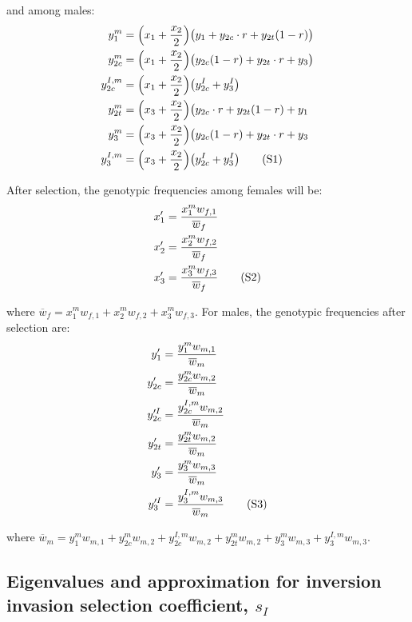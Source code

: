 \documentclass{article}
\newcommand\numberthis{\addtocounter{equation}{1}\tag{\theequation}}
\begin{document}
\begin{appendices}
\noindent and among males:
\begin{align*}
	y^m_{1}      &= \Big( x_1 + \frac{x_2}{2} \Big) \big(y_1 + y_{2c} \cdot r + y_{2t}(1 - r)  \big) \\
	y^m_{2c}     &= \Big( x_1 + \frac{x_2}{2} \Big) \big( y_{2c} (1 - r) + y_{2t} \cdot r + y_3 \big) \\
	y^{I,m}_{2c} &= \Big( x_1 + \frac{x_2}{2} \Big) \big(y^I_{2c} + y^I_{3} \big)  \\
	y^m_{2t}     &= \Big( x_3 + \frac{x_2}{2} \Big) \big( y_{2c} \cdot r + y_{2t}(1 - r) + y_1 \\
	y^m_{3}      &= \Big( x_3 + \frac{x_2}{2} \Big) \big( y_{2c}(1 - r) + y_{2t} \cdot r + y_3 \\
	y^{I,m}_{3}  &= \Big( x_3 + \frac{x_2}{2} \Big) \big(y^I_{2c} + y^I_{3} \big)  \numberthis
\end{align*}

\noindent After selection, the genotypic frequencies among females will be:
\begin{align*}
	x'_{1} &= \frac{x^m_1 w_{f,1}}{\overline{w}_{f}}\\
	x'_{2} &= \frac{x^m_2 w_{f,2}}{\overline{w}_{f}}\\
	x'_{3} &= \frac{x^m_3 w_{f,3}}{\overline{w}_{f}} \numberthis
\end{align*}

\noindent where $\overline{w}_{f} = x^m_1 w_{f,1} + x^m_2 w_{f,2} + x^m_3 w_{f,3}$. For males, the genotypic frequencies after selection are:
\begin{align*}
	y'_{1}       &= \frac{y^m_1 w_{m,1}}{\overline{w}_{m}} \\
	y'_{2c}      &= \frac{y^m_{2c} w_{m,2}}{\overline{w}_{m}} \\
	y'^{I}_{2c}  &= \frac{y^{I,m}_{2c} w_{m,2}}{\overline{w}_{m}}  \\
	y'_{2t}      &= \frac{y^m_{2t} w_{m,2}}{\overline{w}_{m}} \\
	y'_{3}       &= \frac{y^m_3 w_{m,3}}{\overline{w}_{m}} \\
	y'^{I}_{3}   &= \frac{y^{I,m}_3 w_{m,3}}{\overline{w}_{m}} \numberthis
\end{align*}

\noindent where $\overline{w}_{m} = y^m_1 w_{m,1} + y^m_{2c} w_{m,2} + y^{I,m}_{2c} w_{m,2} + y^m_{2t} w_{m,2} + y^m_3 w_{m,3} + y^{I,m}_3 w_{m,3}$.

\bigskip


\subsection{Eigenvalues and approximation for inversion invasion selection coefficient, \texorpdfstring{$s_I$}{sI}} \label{SA-eigenSI-Supp}


\end{appendices}
\end{document}
